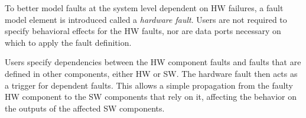 To better model %
faults at the system level dependent on HW failures, a fault model element is introduced called a \textit{hardware fault}. Users are not required to specify behavioral effects for the HW faults, nor are data ports necessary on which to apply the fault definition. 

Users specify dependencies between the HW component faults and faults that are defined in other components, either HW or SW. The hardware fault then acts as a trigger for dependent faults. This allows a simple propagation from the faulty HW component to the SW components that rely on it, affecting the behavior on the outputs of the affected SW components. 

